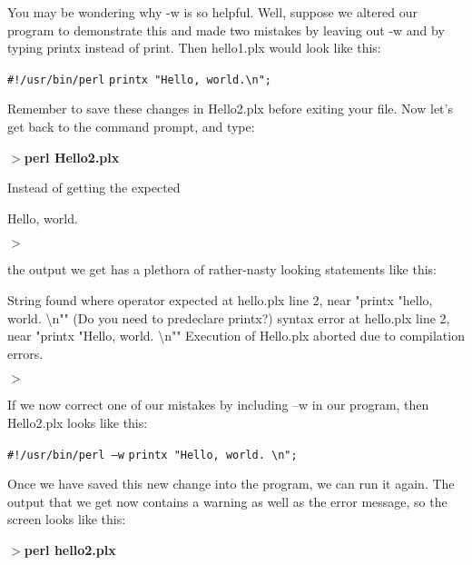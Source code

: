 \documentclass[a4paper,11pt]{book}
\begin{document}
\noindent 

\noindent You may be wondering why -w is so helpful.  Well, suppose we altered our program to demonstrate this and made two mistakes by leaving out -w and by typing printx instead of print. Then hello1.plx would look like this:

\noindent 

\noindent \texttt{\#!/usr/bin/perl}
\noindent \texttt{printx "Hello, world.\textbackslash n";}

\noindent

\noindent Remember to save these changes in Hello2.plx before exiting your file. Now let's get back to the command prompt, and type:

\noindent 

\noindent \textbf{$>$perl Hello2.plx}

\noindent 

\noindent Instead of getting the expected

\noindent Hello, world.

\noindent $>$

\noindent 

\noindent the output we get has a plethora of rather-nasty looking statements like this:

\noindent 

\noindent String found where operator expected at hello.plx line 2, near "printx "hello, world. \textbackslash n"" (Do you need to predeclare printx?) syntax error at hello.plx line 2, near "printx "Hello, world. \textbackslash n"" Execution of Hello.plx aborted due to compilation errors.

\noindent $>$

\noindent 

\noindent If we now correct one of our mistakes by including --w in our program, then Hello2.plx looks like this:

\noindent 

\noindent \texttt{\#!/usr/bin/perl --w}
\noindent \texttt{printx "Hello, world. \textbackslash n";}

\noindent 

\noindent Once we have saved this new change into the program, we can run it again. The output that we get now contains a warning as well as the error message, so the screen looks like this:

\noindent 

\noindent \textbf{$>$perl hello2.plx}

\noindent 
\end{document}
